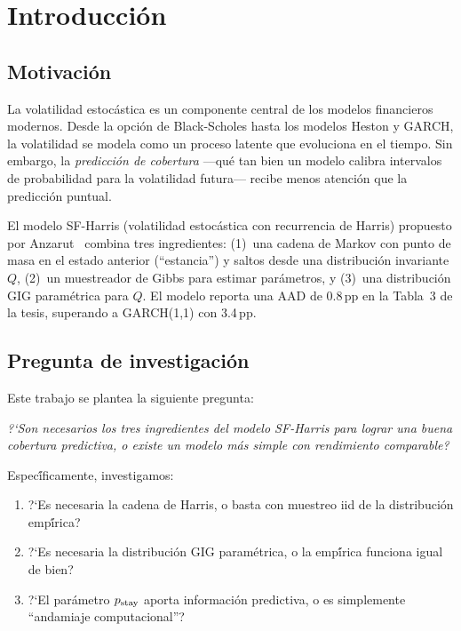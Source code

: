
\chapter{Introducci\'{o}n}

\section{Motivaci\'{o}n}

La volatilidad estoc\'{a}stica es un componente central de los modelos financieros modernos.
Desde la opci\'{o}n de Black-Scholes hasta los modelos Heston y GARCH, la volatilidad
se modela como un proceso latente que evoluciona en el tiempo.
Sin embargo, la \emph{predicci\'{o}n de cobertura} ---qu\'{e} tan bien un modelo calibra
intervalos de probabilidad para la volatilidad futura--- recibe menos atenci\'{o}n que
la predicci\'{o}n puntual.

El modelo SF-Harris (volatilidad estoc\'{a}stica con recurrencia de Harris) propuesto por
Anzarut~\citep{anzarut2024} combina tres ingredientes: (1)~una cadena de Markov con
punto de masa en el estado anterior (``estancia'') y saltos desde una distribuci\'{o}n
invariante $Q$, (2)~un muestreador de Gibbs para estimar par\'{a}metros, y (3)~una
distribuci\'{o}n GIG param\'{e}trica para $Q$.
El modelo reporta una AAD de 0.8\,pp en la Tabla~3 de la tesis,
superando a GARCH(1,1) con 3.4\,pp.

\section{Pregunta de investigaci\'{o}n}

Este trabajo se plantea la siguiente pregunta:

\begin{center}
\textit{?`Son necesarios los tres ingredientes del modelo SF-Harris para lograr
una buena cobertura predictiva, o existe un modelo m\'{a}s simple con rendimiento comparable?}
\end{center}

Espec\'{\'i}ficamente, investigamos:
\begin{enumerate}[label=(\roman*)]
    \item ?`Es necesaria la cadena de Harris, o basta con muestreo iid de la distribuci\'{o}n emp\'{\'i}rica?
    \item ?`Es necesaria la distribuci\'{o}n GIG param\'{e}trica, o la emp\'{\'i}rica funciona igual de bien?
    \item ?`El par\'{a}metro $p_{\text{stay}}$ aporta informaci\'{o}n predictiva, o es simplemente ``andamiaje computacional''?
\end{enumerate}

